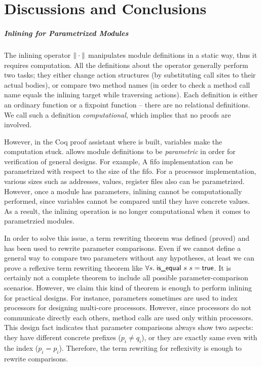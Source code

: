 \chapter{Discussions and Conclusions}
\label{chap:conclusions}

\paragraph{Inlining for Parametrized Modules}

The inlining operator $\| \cdot \|$ manipulates module definitions
in a static way, thus it requires computation. All the definitions
about the operator generally perform two tasks; they either change
action structures (by substituting call sites to their actual bodies),
or compare two method names (in order to check a method call name
equals the inlining target while traversing actions). Each definition
is either an ordinary function or a fixpoint function -- there are no
relational definitions. We call such a definition
\emph{computational}, which implies that no proofs are involved.

However, in the Coq proof assistant where \Kami{} is built, variables
make the computation stuck. \Kami{} allows module definitions to be
\emph{parametric} in order for verification of general designs. For
example, A fifo implementation can be parametrized with respect to the
size of the fifo. For a processor implementation, various sizes such
as addresses, values, register files also can be parametrized.
However, once a module has parameters, inlining cannot be
computationally performed, since variables cannot be compared until
they have concrete values. As a result, the inlining operation is no
longer computational when it comes to parametrzied modules.

In order to solve this issue, a term rewriting theorem was defined
(proved) and has been used to rewrite parameter comparisons. Even if
we cannot define a general way to compare two parameters without any
hypotheses, at least we can prove a reflexive term rewriting theorem
like $\forall s.\; \textsf{is\_equal}\ s\ s = \textsf{true}$. It is certainly
not a complete theorem to include all possible parameter-comparison
scenarios. However, we claim this kind of theorem is enough to perform
inlining for practical designs. For instance, parameters sometimes are
used to index processors for designing multi-core processors. However,
since processors do not communicate directly each others, method calls
are used only within processors. This design fact indicates that
parameter comparisons always show two aspects: they have different
concrete prefixes ($p_i \neq q_i$), or they are exactly same even with
the index ($p_i = p_i$). Therefore, the term rewriting for reflexivity
is enough to rewrite comparisons.

